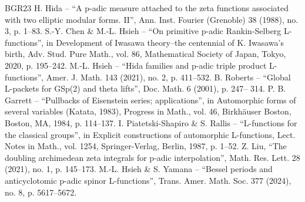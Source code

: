 \documentclass[10pt]{amsart}
\theoremstyle{plain}
\theoremstyle{remark}
\begin{document}
\begin{thebibliography}{BGR23}
 H. Hida – “A p-adic measure attached to the zeta functions associated with two elliptic modular forms. II”, Ann. Inst. Fourier (Grenoble) 38 (1988), no. 3, p. 1–83.
 S.-Y. Chen \& M.-L. Hsieh – “On primitive p-adic Rankin-Selberg L-functions”, in Development of Iwasawa theory–the centennial of K. Iwasawa’s birth, Adv. Stud. Pure Math., vol. 86, Mathematical Society of Japan, Tokyo, 2020, p. 195–242.
 M.-L. Hsieh – “Hida families and p-adic triple product L-functions”, Amer. J. Math. 143 (2021), no. 2, p. 411–532.
 B. Roberts – “Global L-packets for GSp(2) and theta lifts”, Doc. Math. 6 (2001), p. 247– 314.
 P. B. Garrett – “Pullbacks of Eisenstein series; applications”, in Automorphic forms of several variables (Katata, 1983), Progress in Math., vol. 46, Birkhäuser Boston, Boston, MA, 1984, p. 114–137.
 I. Piatetski-Shapiro \& S. Rallis – “L-functions for the classical groups”, in Explicit constructions of automorphic L-functions, Lect. Notes in Math., vol. 1254, Springer-Verlag, Berlin, 1987, p. 1–52.
 Z. Liu, “The doubling archimedean zeta integrals for p-adic interpolation”, Math. Res. Lett. 28 (2021), no. 1, p. 145–173.
 M.-L. Hsieh \& S. Yamana – “Bessel periods and anticyclotomic p-adic spinor L-functions”, Trans. Amer. Math. Soc. 377 (2024), no. 8, p. 5617–5672.
\end{thebibliography}
\end{document}
